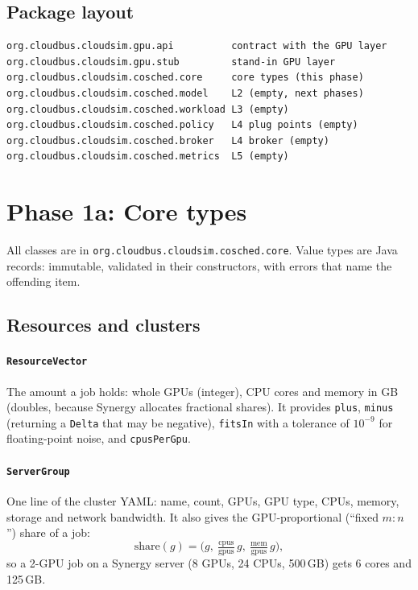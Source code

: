 \documentclass[11pt,a4paper]{article}
\newcommand{\code}[1]{\texttt{#1}}
\begin{document}
\subsection{Package layout}
\begin{lstlisting}
org.cloudbus.cloudsim.gpu.api          contract with the GPU layer
org.cloudbus.cloudsim.gpu.stub         stand-in GPU layer
org.cloudbus.cloudsim.cosched.core     core types (this phase)
org.cloudbus.cloudsim.cosched.model    L2 (empty, next phases)
org.cloudbus.cloudsim.cosched.workload L3 (empty)
org.cloudbus.cloudsim.cosched.policy   L4 plug points (empty)
org.cloudbus.cloudsim.cosched.broker   L4 broker (empty)
org.cloudbus.cloudsim.cosched.metrics  L5 (empty)
\end{lstlisting}

\section{Phase 1a: Core types}

All classes are in \code{org.cloudbus.cloudsim.cosched.core}. Value types are Java records:
immutable, validated in their constructors, with errors that name the offending item.

\subsection{Resources and clusters}

\paragraph{\code{ResourceVector}} The amount a job holds: whole GPUs (integer), CPU cores and
memory in GB (doubles, because Synergy allocates fractional shares). It provides \code{plus},
\code{minus} (returning a \code{Delta} that may be negative), \code{fitsIn} with a tolerance of
$10^{-9}$ for floating-point noise, and \code{cpusPerGpu}.

\paragraph{\code{ServerGroup}} One line of the cluster YAML: name, count, GPUs, GPU type,
CPUs, memory, storage and network bandwidth. It also gives the GPU-proportional (``fixed
$m{:}n$'') share of a job:
\[
  \text{share}(g) = \Big(g,\ \tfrac{\text{cpus}}{\text{gpus}}\,g,\ \tfrac{\text{mem}}{\text{gpus}}\,g\Big),
\]
so a 2-GPU job on a Synergy server (8 GPUs, 24 CPUs, 500\,GB) gets 6 cores and 125\,GB.
\end{document}
